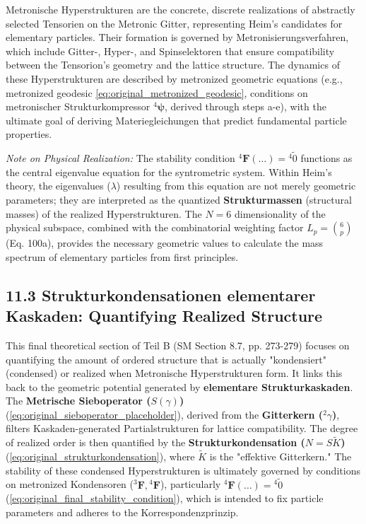\documentclass[12pt]{article}
\newcommand{\metrischesieboperator}{S(\gamma)}
\newcommand{\metronischerstrukturkompressor}{{}^4\bm{\psi}}
\newcommand{\metronisiertekondensor}[1]{{}^{#1}\mathbf{F}}
\begin{document}
Metronische Hyperstrukturen are the concrete, discrete realizations of abstractly selected Tensorien on the Metronic Gitter, representing Heim's candidates for elementary particles. Their formation is governed by Metronisierungsverfahren, which include Gitter-, Hyper-, and Spinselektoren that ensure compatibility between the Tensorion's geometry and the lattice structure. The dynamics of these Hyperstrukturen are described by metronized geometric equations (e.g., metronized geodesic \eqref{eq:original_metronized_geodesic}, conditions on metronischer Strukturkompressor \(\metronischerstrukturkompressor\), derived through steps a-e), with the ultimate goal of deriving Materiegleichungen that predict fundamental particle properties.

\textit{Note on Physical Realization:} The stability condition $\metronisiertekondensor{4}(\dots) = {}^{4}\tilde{0}$ functions as the central eigenvalue equation for the syntrometric system. Within Heim's theory, the eigenvalues ($\lambda$) resulting from this equation are not merely geometric parameters; they are interpreted as the quantized \textbf{Strukturmassen} (structural masses) of the realized Hyperstrukturen. The $N=6$ dimensionality of the physical subspace, combined with the combinatorial weighting factor $L_p = \binom{6}{p}$ (Eq. 100a), provides the necessary geometric values to calculate the mass spectrum of elementary particles from first principles.

\subsection{11.3 Strukturkondensationen elementarer Kaskaden: Quantifying Realized Structure}
\label{sec:strukturkondensation}

This final theoretical section of Teil B (SM Section 8.7, pp. 273-279) focuses on quantifying the amount of ordered structure that is actually "kondensiert" (condensed) or realized when Metronische Hyperstrukturen form. It links this back to the geometric potential generated by \textbf{elementare Strukturkaskaden}. The \textbf{Metrische Sieboperator (\(\metrischesieboperator\))} (\eqref{eq:original_sieboperator_placeholder}), derived from the \textbf{Gitterkern (\({}^2\gamma\))}, filters Kaskaden-generated Partialstrukturen for lattice compatibility. The degree of realized order is then quantified by the \textbf{Strukturkondensation (\(N = S\tilde{K}\))} (\eqref{eq:original_strukturkondensation}), where \(\tilde{K}\) is the "effektive Gitterkern." The stability of these condensed Hyperstrukturen is ultimately governed by conditions on metronized Kondensoren (\(\metronisiertekondensor{3}, \metronisiertekondensor{4}\)), particularly \( \metronisiertekondensor{4}(\dots) = {}^{4}\tilde{0} \) (\eqref{eq:original_final_stability_condition}), which is intended to fix particle parameters and adheres to the Korrespondenzprinzip.
\end{document}
